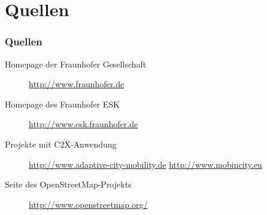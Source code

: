 \section{Quellen}
\begin{frame} \frametitle{Quellen}
  \begin{description}
  \item[Homepage der Fraunhofer Gesellschaft] \url{http://www.fraunhofer.de}
  \item[Homepage des Fraunhofer ESK] \url{http://www.esk.fraunhofer.de}
  \item[Projekte mit C2X-Anwendung] 
    \url{http://www.adaptive-city-mobility.de} 
    \url{http://www.mobincity.eu}
  \item[Seite des OpenStreetMap-Projekts] \url{http://www.openstreetmap.org/}
  \end{description}
\end{frame}